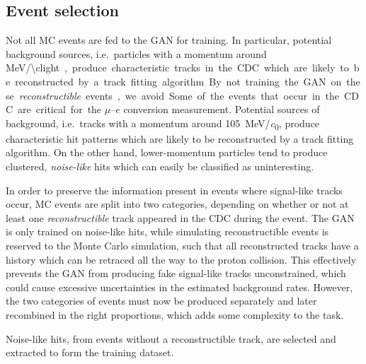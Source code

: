 \subsection{Event selection}


Not all MC events are fed to the GAN for training. In particular, potential background sources, i.e.\ particles with a momentum around \SI{MeV/\clight}, produce characteristic tracks in the CDC which are likely to be reconstructed by a track fitting algorithm. By not training the GAN on these \emph{reconstructible} events, we avoid 

Some of the events that occur in the CDC are critical for the $\mu$--$e$ conversion measurement. Potential sources of background, i.e.\ tracks with a momentum around \SI{105}{\MeV/\clight}, produce characteristic hit patterns which are likely to be reconstructed by a track fitting algorithm. On the other hand, lower-momentum particles tend to produce clustered, \emph{noise-like} hits which can easily be classified as uninteresting.

In order to preserve the information present in events where signal-like tracks occur,  MC events are split into two categories, depending on whether or not at least one \emph{reconstructible} track appeared in the CDC during the event. The GAN is only trained on noise-like hits, while simulating reconstructible events is reserved to the Monte Carlo simulation, such that all reconstructed tracks have a history which can be retraced all the way to the proton collision. This effectively prevents the GAN from producing fake signal-like tracks unconstrained, which could cause excessive uncertainties in the estimated background rates. However, the two categories of events must now be produced separately and later recombined in the right proportions, which adds some complexity to the task.


Noise-like hits, from events without a reconstructible track, are selected and extracted to form the training dataset. 



